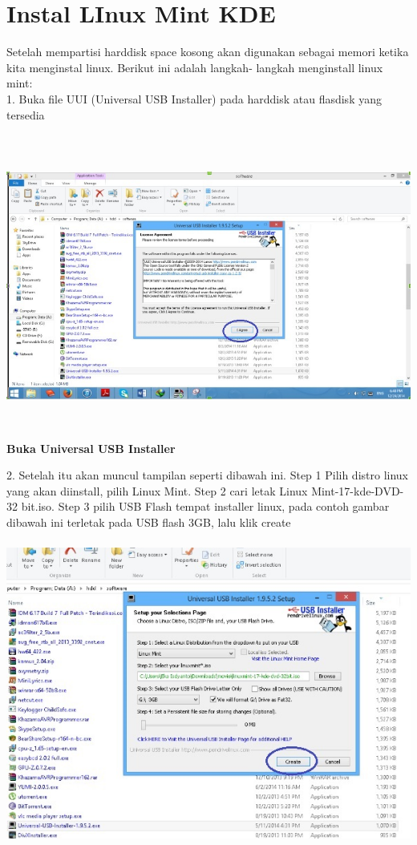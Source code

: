 \documentclass[11pt,fleqn]{book} %
\begin{document}
\section{Instal LInux Mint KDE}
Setelah mempartisi harddisk space kosong akan digunakan sebagai memori ketika kita menginstal linux.
Berikut ini adalah langkah- langkah menginstall linux mint:\\
1. Buka file UUI (Universal USB Installer) pada harddisk atau flasdisk yang tersedia
\begin{center}
\includegraphics[width=14cm,height=10cm]{uui.jpg}\\
  \textbf{Buka Universal USB Installer}
  \end{center}
2. Setelah itu akan muncul tampilan seperti dibawah ini. Step 1 Pilih distro linux yang akan diinstall, pilih Linux Mint. 
Step 2 cari letak Linux Mint-17-kde-DVD-32 bit.iso. Step 3 pilih USB Flash tempat installer linux, pada contoh gambar dibawah ini terletak pada USB flash 3GB, 
lalu klik create\\
\begin{center}
\includegraphics[width=14cm,height=10cm]{ekstrak2.jpg}\\
  \end{center}
\end{document}
